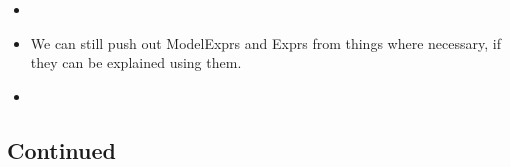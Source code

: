 \begin{itemize}
\begin{itemize}
		      \item {}

		      \item We can still push out ModelExprs and Exprs from things where
		            necessary, if they can be explained using them.

		      \item {}

	      \end{itemize}

\end{itemize}

\subsection{Continued}

